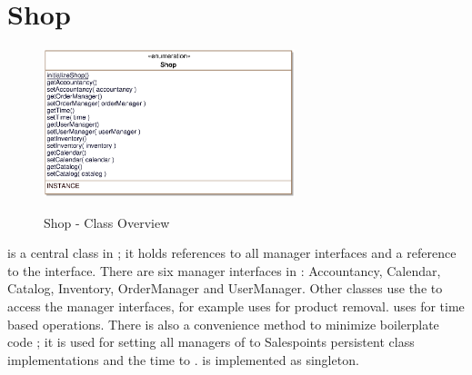 \section{Shop}
\label{shop}
\label{sec:shop}

\begin{figure}[ht]
	\centering
  \includegraphics[width=0.65\textwidth]{images/Shop_Overview.eps}
	\label{shop_overview}
	\caption{Shop - Class Overview}
\end{figure}

 is a central class in \salespoint{}; it holds references to all manager interfaces and a reference to the  interface.
There are six manager interfaces in \salespoint{}: Accountancy, Calendar, Catalog, Inventory, OrderManager and UserManager.
Other classes use the  to access the manager interfaces, for example  uses  for product removal.
 uses  for time based operations.
There is also a convenience method to minimize boilerplate code ; it is used for setting all managers of  to Salespoints persistent class implementations and the time to .
 is implemented as singleton.
